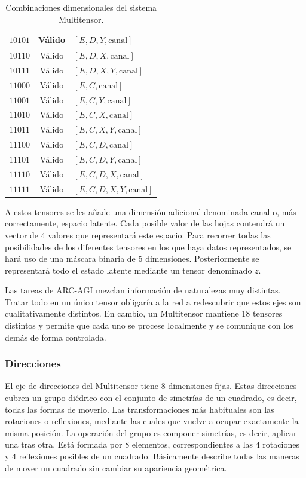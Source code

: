 \documentclass[11pt,a4paper,spanish]{book}
\numberwithin{equation}{chapter}
\numberwithin{figure}{chapter}
\begin{document}
\begin{table}[h]
\begin{tabular}{|c|c|p{9.2cm}|}
	\hline
	\(10101\) & Válido & $[E,D,Y,\mathrm{canal}]$ \\
	\hline
	\(10110\) & Válido & $[E,D,X,\mathrm{canal}]$ \\
	\hline
	\(10111\) & Válido & $[E,D,X,Y,\mathrm{canal}]$ \\
	\hline
	\(11000\) & Válido & $[E,C,\mathrm{canal}]$ \\
	\hline
	\(11001\) & Válido & $[E,C,Y,\mathrm{canal}]$ \\
	\hline
	\(11010\) & Válido & $[E,C,X,\mathrm{canal}]$ \\
	\hline
	\(11011\) & Válido & $[E,C,X,Y,\mathrm{canal}]$ \\
	\hline
	\(11100\) & Válido & $[E,C,D,\mathrm{canal}]$ \\
	\hline
	\(11101\) & Válido & $[E,C,D,Y,\mathrm{canal}]$ \\
	\hline
	\(11110\) & Válido & $[E,C,D,X,\mathrm{canal}]$ \\
	\hline
	\(11111\) & Válido & $[E,C,D,X,Y,\mathrm{canal}]$ \\
	\hline
\end{tabular}
\caption{Combinaciones dimensionales del sistema Multitensor.}
\label{tab:multitensor-dimensions}
\end{table}

\FloatBarrier

A estos tensores se les añade una dimensión adicional denominada canal o, más correctamente, espacio latente. Cada posible valor de las hojas contendrá un vector de 4
valores que representará este espacio. Para recorrer todas las posibilidades de los diferentes tensores en los que haya datos
representados, se hará uso de una máscara binaria de 5 dimensiones. Posteriormente se representará todo el estado latente mediante un
tensor denominado \(z\).

Las tareas de ARC-AGI mezclan información de naturalezas muy distintas. Tratar todo en un único tensor obligaría a la red a redescubrir que estos 
ejes son cualitativamente distintos. En cambio, un Multitensor mantiene 18 tensores distintos y permite que cada uno se procese localmente y se comunique con
los demás de forma controlada.

\subsubsection{Direcciones}

El eje de direcciones del Multitensor tiene 8 dimensiones fijas. Estas direcciones cubren un grupo diédrico con el conjunto de simetrías
de un cuadrado, es decir, todas las formas de moverlo. Las transformaciones más habituales son las rotaciones o reflexiones, mediante las cuales
que vuelve a ocupar exactamente la misma posición. La operación del grupo es componer simetrías, es decir, aplicar una tras otra. Está formada
por 8 elementos, correspondientes a las 4 rotaciones y 4 reflexiones posibles de un cuadrado. Básicamente describe todas las maneras de mover 
un cuadrado sin cambiar su apariencia geométrica.
\end{document}
